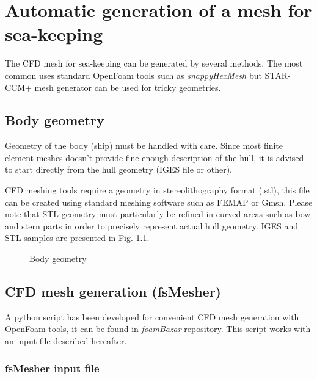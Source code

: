 \chapter{Automatic generation of a mesh for sea-keeping}

The CFD mesh for sea-keeping can be generated by several methods. The most common uses standard OpenFoam tools such as \emph{snappyHexMesh} but STAR-CCM+ mesh generator can be used for tricky geometries.

\section{Body geometry}

Geometry of the body (ship) must be handled with care. Since most finite element meshes doesn't provide fine enough description of the hull, it is advised to start directly from the hull geometry (IGES file or other).

CFD meshing tools require a geometry in stereolithography format (.stl), this file can be created using standard meshing software such as FEMAP or Gmsh. Please note that STL geometry must particularly be refined in curved areas such as bow and stern parts in order to precisely represent actual hull geometry. IGES and STL samples are presented in Fig. \ref{geom}.

\begin{figure}[htbp]
\begin{center}
\end{center}
\caption{Body geometry}
\label{geom} 
\end{figure}

\section{CFD mesh generation (fsMesher)}

A python script has been developed for convenient CFD mesh generation with OpenFoam tools,  it can be found in \emph{foamBazar} repository. This script works with an input file described hereafter.

\subsection{fsMesher input file}

